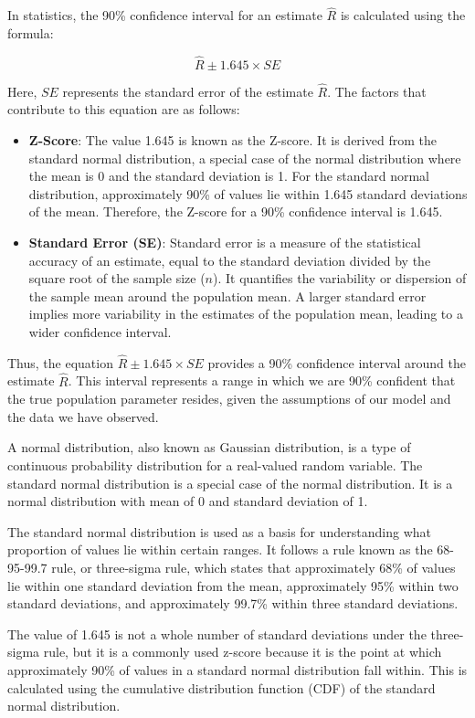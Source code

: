 In statistics, the 90\% confidence interval for an estimate $\hat{R}$ is calculated using the formula:

\[
\hat{R} \pm 1.645 \times SE
\]

Here, $SE$ represents the standard error of the estimate $\hat{R}$. The factors that contribute to this equation are as follows:

\begin{itemize}
\item \textbf{Z-Score}: The value 1.645 is known as the Z-score. It is derived from the standard normal distribution, a special case of the normal distribution where the mean is 0 and the standard deviation is 1. For the standard normal distribution, approximately 90\% of values lie within 1.645 standard deviations of the mean. Therefore, the Z-score for a 90\% confidence interval is 1.645.

\item \textbf{Standard Error (SE)}: Standard error is a measure of the statistical accuracy of an estimate, equal to the standard deviation divided by the square root of the sample size ($n$). It quantifies the variability or dispersion of the sample mean around the population mean. A larger standard error implies more variability in the estimates of the population mean, leading to a wider confidence interval.
\end{itemize}

Thus, the equation $\hat{R} \pm 1.645 \times SE$ provides a 90\% confidence interval around the estimate $\hat{R}$. This interval represents a range in which we are 90\% confident that the true population parameter resides, given the assumptions of our model and the data we have observed.


A normal distribution, also known as Gaussian distribution, is a type of continuous probability distribution for a real-valued random variable. The standard normal distribution is a special case of the normal distribution. It is a normal distribution with mean of 0 and standard deviation of 1.

The standard normal distribution is used as a basis for understanding what proportion of values lie within certain ranges. It follows a rule known as the 68-95-99.7 rule, or three-sigma rule, which states that approximately 68\% of values lie within one standard deviation from the mean, approximately 95\% within two standard deviations, and approximately 99.7\% within three standard deviations.

The value of 1.645 is not a whole number of standard deviations under the three-sigma rule, but it is a commonly used z-score because it is the point at which approximately 90\% of values in a standard normal distribution fall within. This is calculated using the cumulative distribution function (CDF) of the standard normal distribution.

